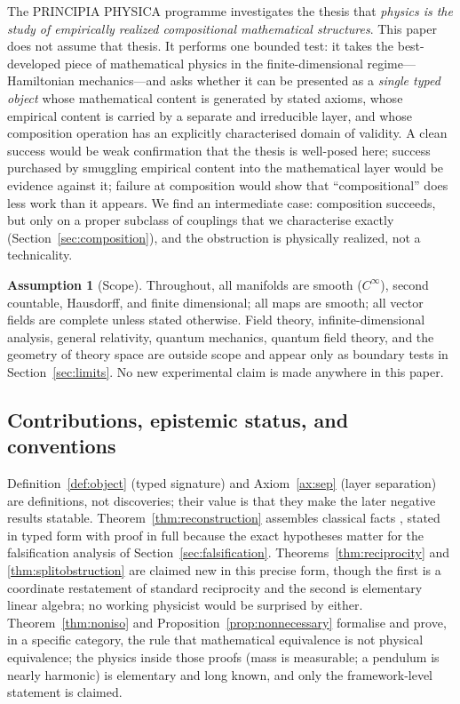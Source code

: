 \documentclass[10pt,a4paper]{article}
\theoremstyle{plain}
\theoremstyle{definition}
\newtheorem{assumption}[theorem]{Assumption}
\newcommand{\Cinf}{C^{\infty}}
\begin{document}
The PRINCIPIA PHYSICA programme investigates the thesis that \emph{physics is the study of empirically realized compositional mathematical structures}. This paper does not assume that thesis. It performs one bounded test: it takes the best-developed piece of mathematical physics in the finite-dimensional regime---Hamiltonian mechanics---and asks whether it can be presented as a \emph{single typed object} whose mathematical content is generated by stated axioms, whose empirical content is carried by a separate and irreducible layer, and whose composition operation has an explicitly characterised domain of validity. A clean success would be weak confirmation that the thesis is well-posed here; success purchased by smuggling empirical content into the mathematical layer would be evidence against it; failure at composition would show that ``compositional'' does less work than it appears. We find an intermediate case: composition succeeds, but only on a proper subclass of couplings that we characterise exactly (Section~\ref{sec:composition}), and the obstruction is physically realized, not a technicality.

\begin{assumption}[Scope]
\label{ass:scope}
Throughout, all manifolds are smooth ($\Cinf$), second countable, Hausdorff, and finite dimensional; all maps are smooth; all vector fields are complete unless stated otherwise. Field theory, infinite-dimensional analysis, general relativity, quantum mechanics, quantum field theory, and the geometry of theory space are outside scope and appear only as boundary tests in Section~\ref{sec:limits}. No new experimental claim is made anywhere in this paper.
\end{assumption}

\subsection{Contributions, epistemic status, and conventions}

Definition~\ref{def:object} (typed signature) and Axiom~\ref{ax:sep} (layer separation) are definitions, not discoveries; their value is that they make the later negative results statable. Theorem~\ref{thm:reconstruction} assembles classical facts \cite{AbrahamMarsden1978,Arnold1989,MarsdenRatiu1999}, stated in typed form with proof in full because the exact hypotheses matter for the falsification analysis of Section~\ref{sec:falsification}. Theorems~\ref{thm:reciprocity} and \ref{thm:splitobstruction} are claimed new in this precise form, though the first is a coordinate restatement of standard reciprocity and the second is elementary linear algebra; no working physicist would be surprised by either. Theorem~\ref{thm:noniso} and Proposition~\ref{prop:nonnecessary} formalise and prove, in a specific category, the rule that mathematical equivalence is not physical equivalence; the physics inside those proofs (mass is measurable; a pendulum is nearly harmonic) is elementary and long known, and only the framework-level statement is claimed.
\end{document}
